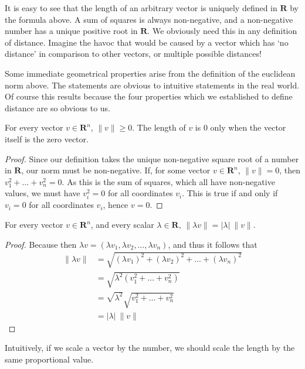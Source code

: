 It is easy to see that the length of an arbitrary vector is uniquely defined in $\mathbf{R}$ by the formula above. A sum of squares is always non-negative, and a non-negative number has a unique positive root in $\mathbf{R}$. We obviously need this in any definition of distance. Imagine the havoc that would be caused by a vector which has `no distance' in comparison to other vectors, or multiple possible distances!

Some immediate geometrical properties arise from the definition of the euclidean norm above. The statements are obvious to intuitive statements in the real world. Of course this results because the four properties which we established to define distance are so obvious to us.

\begin{lemma}
  For every vector $v \in \mathbf{R}^n$, $\|v\| \geq 0$. The length of $v$ is 0 only when the vector itself is the zero vector.
\end{lemma}
\begin{proof}
  Since our definition takes the unique non-negative square root of a number in $\mathbf{R}$, our norm must be non-negative. If, for some vector $v \in \mathbf{R}^n$, $\| v \| = 0$, then $v_1^2 + \dots + v_n^2 = 0$. As this is the sum of squares, which all have non-negative values, we must have $v_i^2 = 0$ for all coordinates $v_i$. This is true if and only if $v_i = 0$ for all coordinates $v_i$, hence $v = 0$.
\end{proof}

\begin{lemma}
  For every vector $v \in \mathbf{R}^n$, and every scalar $\lambda \in \mathbf{R}$, $\| \lambda v \| = | \lambda |\ \| v \|$.
\end{lemma}
\begin{proof}
  Because then $\lambda v = (\lambda v_1, \lambda v_2, \dots, \lambda v_n)$, and thus it follows that
  \begin{align*}
    \| \lambda v \| &= \sqrt{(\lambda v_1)^2 + (\lambda v_2)^2 + \dots + (\lambda v_n)^2}\\
                    &= \sqrt{\lambda^2(v_1^2 + \dots + v_n^2)}\\
                    &= \sqrt{\lambda^2} \sqrt{v_1^2 + \dots + v_n^2}\\
                    &= | \lambda |\ \| v \|
  \end{align*}
\end{proof}

Intuitively, if we scale a vector by the number, we should scale the length by the same proportional value.

